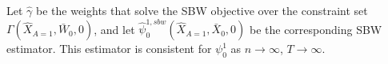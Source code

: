 

%

\begin{proposition}\label{cl3}
Let $\hat{\gamma}$ be the weights that solve the SBW objective over the constraint set $\Gamma(\hat{X}_{A=1}, \bar{W}_0, 0)$, and let $\hat{\psi}^{1, sbw}_0(\hat{X}_{A=1}, \bar{X}_0, 0)$ be the corresponding SBW estimator. This estimator is consistent for $\psi_0^1$ as $n \to \infty$, $T \to \infty$.
\end{proposition}



